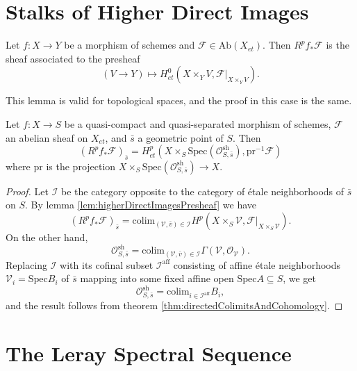\section{Stalks of Higher Direct Images}
\label{section-stalks-direct-image}

\begin{lemma}
\label{lem:higherDirectImagesPresheaf}
Let $f: X\to Y$ be a morphism of schemes and $\mathcal{F}\in 
\text{Ab}(X_{et})$. Then $R^pf_*\mathcal{F}$ is the sheaf associated to the 
presheaf
$$
(V\to Y)\longmapsto H_{et}^0 \left(X\times_Y V, 
\mathcal{F}|_{X\times_YV}\right).
$$
\end{lemma}

\noindent
This lemma is valid for topological spaces, and the proof in this case is the 
same.

\begin{theorem} \label{thm:stalkOfHigherDirectImages}
Let $f: X\to S$ be a quasi-compact and quasi-separated morphism of schemes, 
$\mathcal{F}$ an abelian sheaf on $X_{et}$, and $\bar s$ a geometric point of 
$S$. Then
$$
\left(R^pf_* \mathcal{F}\right)_{\bar s} = H_{et}^p\left( X\times_S 
\text{Spec}(\mathcal{O}_{S, \bar s}^\mathrm{sh}), 
\text{pr}^{-1}\mathcal{F}\right)
$$
where $\text{pr}$ is the projection $X\times_S \text{Spec}(\mathcal{O}_{S, 
\bar{s}}^\mathrm{sh}) \to X$.
\end{theorem}

\begin{proof}
Let $\mathcal{I}$ be the category opposite to the category of \'etale 
neighborhoods of $\bar s$ on $S$. By lemma \ref{lem:higherDirectImagesPresheaf} 
we have
$$
\left(R^pf_*\mathcal{F}\right)_{\bar{s}} = \text{colim}_{(\mathcal{V}, 
\bar{v})\in \mathcal{I}} H^p(X\times_S\mathcal{V}, 
\mathcal{F}|_{X\times_S\mathcal{V}}).
$$
On the other hand, 
$$
\mathcal{O}_{S, \bar{s}}^\mathrm{sh} = \text{colim}_{(\mathcal{V}, \bar v)\in 
\mathcal{I}} \Gamma(\mathcal{V}, \mathcal{O}_\mathcal{V}).
$$
Replacing $\mathcal{I}$ with its cofinal subset $\mathcal{I}^\mathrm{aff}$ 
consisting of affine \'etale neighborhoods $\mathcal{V}_i= \text{Spec} B_i$ of 
$\bar s$ mapping into some fixed affine open $\text{Spec} A \subseteq S$, we get
$$
\mathcal{O}_{S, \bar{s}}^\mathrm{sh} = \text{colim}_{i\in 
\mathcal{I}^\mathrm{aff}} B_i,
$$
and the result follows from theorem \ref{thm:directedColimitsAndCohomology}.
\end{proof}

\section{The Leray Spectral Sequence}
\label{section-leray}


